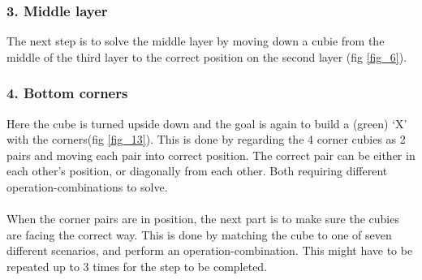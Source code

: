 \documentclass[a4paper,11pt]{kth-mag}
\begin{document}
\subsubsection{3. Middle layer}
The next step is to solve the middle layer by moving down a cubie from the middle of the third layer to the correct position on the second layer (fig \ref{fig_6}). 
\subsubsection{4. Bottom corners}
Here the cube is turned upside down and the goal is again to build a (green) `X' with the corners(fig \ref{fig_13}). This is done by regarding the 4 corner cubies as 2 pairs and moving each pair into correct position. The correct pair can be either in each other's position, or diagonally from each other. Both requiring different operation-combinations to solve.\\\\When the corner pairs are in position, the next part is to make sure the cubies are facing the correct way. This is done by matching the cube to one of seven different scenarios, and perform an operation-combination. This might have to be repeated up to 3 times for the step to be completed. 
\end{document}
